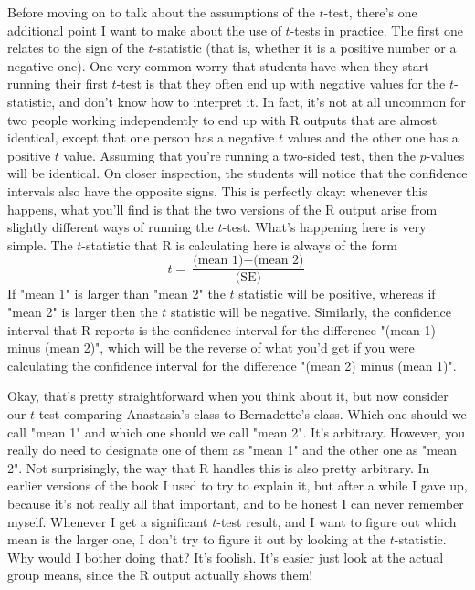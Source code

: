 Before moving on to talk about the assumptions of the $t$-test, there's one additional point I want to make about the use of $t$-tests in practice. The first one relates to the sign of the $t$-statistic (that is, whether it is a positive number or a negative one).  One very common worry that students have when they start running their first $t$-test is that they often end up with negative values for the $t$-statistic, and don't know how to interpret it. In fact, it's not at all uncommon for two  people working independently to end up with R outputs that are almost identical, except that one person has a negative $t$ values and the other one has a positive $t$ value. Assuming that  you're running a two-sided test, then the $p$-values will be identical. On closer inspection, the students will notice that the confidence intervals also have the opposite signs. This is perfectly okay: whenever this happens, what you'll find is that the two versions of the R output arise from slightly different ways of running the $t$-test. What's happening here is very simple. The $t$-statistic that R is calculating here is always of the form 
$$
t = \frac{\mbox{(mean 1)} -\mbox{(mean 2)}}{ \mbox{(SE)}}
$$
If "mean 1" is larger than "mean 2" the $t$ statistic will be positive, whereas if "mean 2" is larger then the $t$ statistic will be negative. Similarly, the confidence interval that R reports is the confidence interval for the difference "(mean 1) minus (mean 2)", which will be the reverse of what you'd get if you were calculating the confidence interval for the difference "(mean 2) minus (mean 1)".

Okay, that's pretty straightforward when you think about it, but now consider our $t$-test comparing Anastasia's class to Bernadette's class. Which one should we call "mean 1" and which one should we call "mean 2". It's arbitrary. However, you really do need to designate one of them as "mean 1" and the other one as "mean 2". Not surprisingly, the way that R handles this is also pretty arbitrary. In earlier versions of the book I used to try to explain it, but after a while I gave up, because it's not really all that important, and to be honest I can never remember myself. Whenever I get a significant $t$-test result, and I want to figure out which mean is the larger one, I don't try to figure it out by looking at the $t$-statistic. Why would I bother doing that? It's foolish. It's easier just look at the actual group means, since the R output actually shows them!


